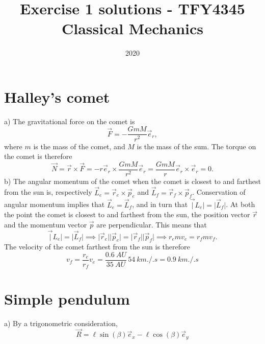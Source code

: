 \documentclass{article}
\title{Exercise 1 solutions - TFY4345 Classical Mechanics}
\date{2020}
\begin{document}
    \maketitle
    \section{Halley's comet}
        a) The gravitational force on the comet is
        \begin{equation*}
            \vec F = - \frac{GmM}{r^2} \vec e_r,
        \end{equation*}
        where $m$ is the mass of the comet, and $M$ is the mass of the sum. The torque on the comet is therefore
        \begin{equation}
            \vec N = \vec r \times \vec F = - r \vec e_r \times \frac{GmM}{r^2} \vec e_r = \frac{GmM}{r} \vec e_r \times \vec e_r = 0. 
        \end{equation}
         b) The angular momentum of the comet when the comet is closest to and farthest from the sun is, respectively $\vec L_e = \vec r_e \times \vec p_e$ and $\vec L_f = \vec r_f \times \vec p_f$. Conservation of angular momentum implies that $\vec L_e = \vec L_f$, and in turn that $\vec |L_e| = |\vec L_f|$. At both the point the comet is closest to and farthest from the sun, the position vector $\vec r$ and the momentum vector $\vec p$ are perpendicular. This means that
        \begin{equation*}
            \vec |L_e| = |\vec L_f| \implies |\vec r_e || \vec p_e| = |\vec r_f || \vec p_f| \implies r_e m v_e = r_f m v_f.
        \end{equation*}
        The velocity of the comet farthest from the sun is therefore
        \begin{equation}
            v_f = \frac{r_e}{r_f} v_e = \frac{\SI{0.6}{AU}}{\SI{35}{AU}} \, \SI{54}{km.\per.s} = \SI{0.9}{km.\per.s} 
        \end{equation}

    \section{Simple pendulum}
        a) By a trigonometric consideration,
        \begin{equation*}
            \vec R = \ell \sin(\beta) \vec e_x - \ell \cos(\beta) \vec e_y
        \end{equation*}
\end{document}
